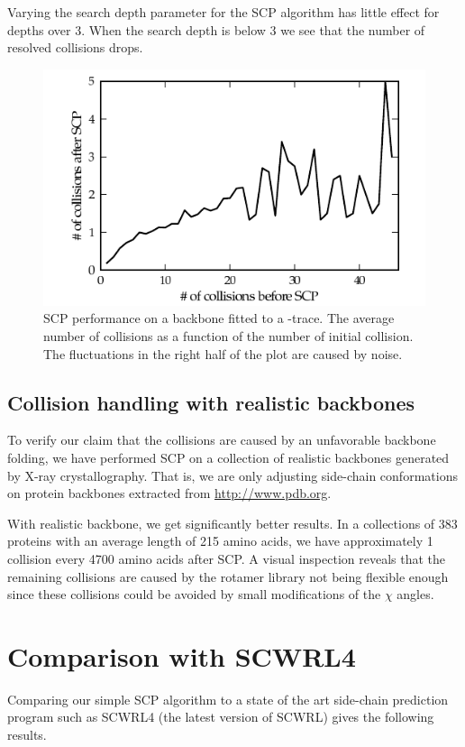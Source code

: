 Varying the search depth parameter for the SCP algorithm has little effect for depths over 3.
When the search depth is below 3 we see that the number of resolved collisions drops.

\label{sec:evaluation_handling_side-chains}
\begin{figure}
	\centering
	\hspace*{-3.5mm}\includegraphics[width=1.1\columnwidth]{figures/plot_scp}
	\caption{SCP performance on a backbone fitted to a \Ca-trace. The average number of collisions as a function of the number of initial collision. The fluctuations in the right half of the plot are caused by noise.}
	\label{fig:plot_scp}
\end{figure}

\subsection{Collision handling with realistic backbones}
To verify our claim that the collisions are caused by an unfavorable backbone folding, we have performed SCP on a collection of realistic backbones generated by X-ray crystallography.
That is, we are only adjusting side-chain conformations on protein backbones extracted from \url{http://www.pdb.org}. 

With realistic backbone, we get significantly better results.
In a collections of 383 proteins with an average length of 215 amino acids, we have approximately 1 collision every 4700 amino acids after SCP.
A visual inspection reveals that the remaining collisions are caused by the rotamer library not being flexible enough since these collisions could be avoided by small modifications of the $\chi$ angles.


\section{Comparison with SCWRL4}
Comparing our simple SCP algorithm to a state of the art side-chain prediction program such as SCWRL4 (the latest version of SCWRL) gives the following results.

